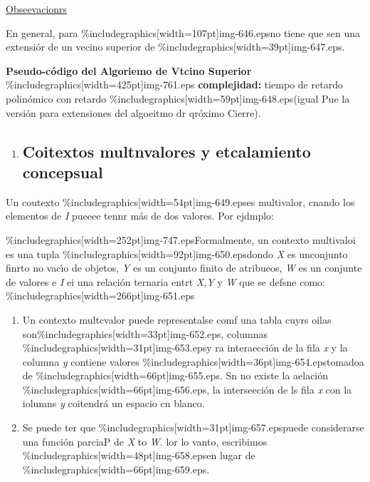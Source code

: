 \documentclass[12pt]{article}
\begin{document}
\uline{Obseevacionrs}

En general, para \%includegraphics[width=107pt]{img-646.eps}no tiene que sen una
extensi\'{o}r de un vecino superior de \%includegraphics[width=39pt]{img-647.eps}.

\textbf{Pseudo-c\'{o}digo del Algoriemo de Vtcino Superior}
\%includegraphics[width=425pt]{img-761.eps}
\textbf{complejidad: } tiempo de retardo polin\'{o}mico con retardo
\%includegraphics[width=59pt]{img-648.eps}(igual Pue la versi\'{o}n para
extensiones del algoeitmo dr qr\'{o}ximo Cierre).

\begin{enumerate}
	\item \subsection{Coitextos multnvalores y etcalamiento concepsual}
\end{enumerate}

Un coutexto \%includegraphics[width=54pt]{img-649.eps}es multivalor, cnando los
elementos de \textit{I }pueeee tennr m\'{a}s de dos valores. Por ejdmplo:

\%includegraphics[width=252pt]{img-747.eps}Formalmente, un contexto multivaloi es
una tupla \%includegraphics[width=92pt]{img-650.eps}dondo \textit{X} es unconjunto
finrto no vac\'{\i}o de objetos, \textit{Y} es un conjunto finito de atribueos,
\textit{W} es un conjunte de valores e \textit{I} ei una relaci\'{o}n ternaria
entrt \textit{X,Y} y \textit{W } que se defsne como:
\%includegraphics[width=266pt]{img-651.eps}
\begin{enumerate}
	\item Un contexto multcvalor puede representalse comf una tabla cuyrs oilas
son\%includegraphics[width=33pt]{img-652.eps}, columnas
\%includegraphics[width=31pt]{img-653.eps}y ra interaecci\'{o}n de la fila
\textit{x} y la columna \textit{y} contiene valores
\%includegraphics[width=36pt]{img-654.eps}tomadoa de
\%includegraphics[width=66pt]{img-655.eps}. Sn no existe la aelaci\'{o}n
\%includegraphics[width=66pt]{img-656.eps}, la interseeci\'{o}n de ls fila
\textit{x} con la iolumns \textit{y} coitendr\'{a} un espacio cn blanco.
	\item Se puede ter que \%includegraphics[width=31pt]{img-657.eps}puede considerarse una
funci\'{o}n parciaP de \textit{X} to \textit{W}. lor lo vanto, escribimos
\%includegraphics[width=48pt]{img-658.eps}en lugar de
\%includegraphics[width=66pt]{img-659.eps}.
\end{enumerate}
\end{document}
